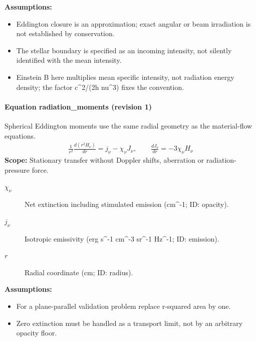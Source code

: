 \noindent\textbf{Assumptions:}
\begin{itemize}
\item Eddington closure is an approximation; exact angular or beam irradiation is not established by conservation.
\item The stellar boundary is specified as an incoming intensity, not silently identified with the mean intensity.
\item Einstein B here multiplies mean specific intensity, not radiation energy density; the factor c\textasciicircum{}2/(2h nu\textasciicircum{}3) fixes the convention.
\end{itemize}

\paragraph{Equation radiation\_moments (revision 1)}
Spherical Eddington moments use the same radial geometry as the material-flow equations.
\begin{equation}
\begin{aligned}
\frac{1}{r^2}\frac{d(r^2H_\nu)}{dr}=j_\nu-\chi_\nu J_\nu,\qquad \frac{dJ_\nu}{dr}=-3\chi_\nu H_\nu
\end{aligned}
\label{eq:escape.coupled_5f_hydrogen:radiation_5f_moments:1}
\end{equation}
\noindent\textbf{Scope:} Stationary transfer without Doppler shifts, aberration or radiation-pressure force.

\begin{description}
\item[$\chi_\nu$] Net extinction including stimulated emission (cm\textasciicircum{}-1; ID: opacity).
\item[$j_\nu$] Isotropic emissivity (erg s\textasciicircum{}-1 cm\textasciicircum{}-3 sr\textasciicircum{}-1 Hz\textasciicircum{}-1; ID: emission).
\item[$r$] Radial coordinate (cm; ID: radius).
\end{description}

\noindent\textbf{Assumptions:}
\begin{itemize}
\item For a plane-parallel validation problem replace r-squared area by one.
\item Zero extinction must be handled as a transport limit, not by an arbitrary opacity floor.
\end{itemize}

